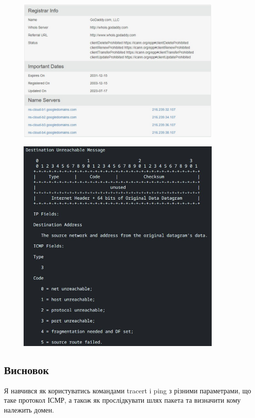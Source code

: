 \documentclass[12pt]{extarticle}
\begin{document}
\begin{figure}[H]
    \centering
    \includegraphics[width=0.90\textwidth]{whois.jpg}
    \caption{}
\end{figure}
\begin{figure}[H]
    \centering
    \includegraphics[width=0.90\textwidth]{rfc.jpg}
    \caption{}
\end{figure}
\vspace{12pt}

\subsection*{Висновок} 
Я навчився як користуватись командами tracert i ping з різними параметрами, 
що таке протокол ІСМР, а також як прослідкувати шлях пакета та визначити кому належить домен.
\end{document}
